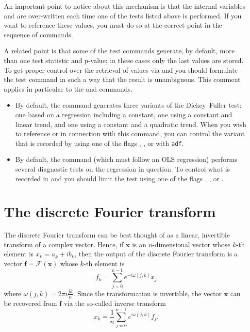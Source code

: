 An important point to notice about this mechanism is that the internal
variables  and  are over-written each time
one of the tests listed above is performed.  If you want to reference
these values, you must do so at the correct point in the sequence of
 commands.  

A related point is that some of the test commands generate, by
default, more than one test statistic and p-value; in these cases only
the last values are stored. To get proper control over the retrieval
of values via  and  you should formulate
the test command in such a way that the result is unambiguous.  This
comment applies in particular to the  and 
commands.

\begin{itemize}
\item By default, the  command generates three variants of
  the Dickey--Fuller test: one based on a regression including a
  constant, one using a constant and linear trend, and one using a
  constant and a quadratic trend.  When you wish to reference
   or  in connection with this command, you
  can control the variant that is recorded by using one of the flags
  , ,  or  with
  \verb+adf+.
\item By default, the  command (which must follow an OLS
  regression) performs several diagnostic tests on the regression in
  question.  To control what is recorded in  and
   you should limit the test using one of the flags
  , ,  or
  .
\end{itemize}

\section{The discrete Fourier transform}
\label{sec:genr-fft}

The discrete Fourier transform can be best thought of as a linear,
invertible transform of a complex vector. Hence, if $\mathbf{x}$ is an
$n$-dimensional vector whose $k$-th element is $x_k = a_k + i b_k$,
then the output of the discrete Fourier transform is a vector
$\mathbf{f} = \mathcal{F}(\mathbf{x})$ whose $k$-th element is
\[
  f_k = \sum_{j=0}^{n-1} e^{-i \omega(j,k) } x_j 
\]
where $\omega(j,k) = 2 \pi i \frac{j k}{n}$. Since the transformation
is invertible, the vector $\mathbf{x}$ can be recovered from
$\mathbf{f}$ via the so-called inverse transform
\[
  x_k = \frac{1}{n} \sum_{j=0}^{n-1} e^{i \omega(j,k) } f_j .
\]

